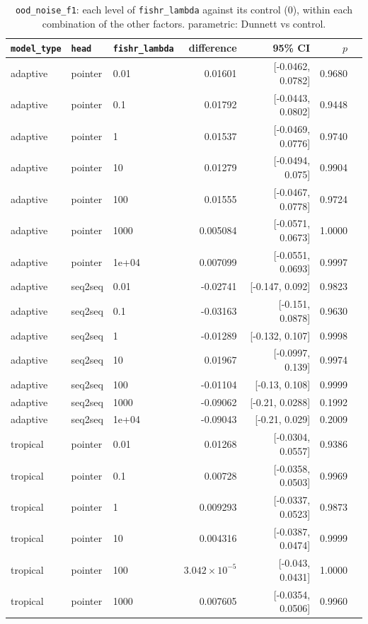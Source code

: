 \documentclass[10pt]{article}
\begin{document}
{\small
\begin{longtable}{lllrrrl}
\caption{\texttt{ood\_noise\_f1}: each level of \texttt{fishr\_lambda} against its control (0), within each combination of the other factors. parametric: Dunnett vs control.}\label{tab:control-ood_noise_f1}\\
\toprule
\texttt{model\_type} & \texttt{head} & \texttt{fishr\_lambda} & difference & 95\% CI & $p$ & \\
\midrule
\endhead
adaptive & pointer & 0.01 & 0.01601 & [-0.0462, 0.0782] & 0.9680 & \\
adaptive & pointer & 0.1 & 0.01792 & [-0.0443, 0.0802] & 0.9448 & \\
adaptive & pointer & 1 & 0.01537 & [-0.0469, 0.0776] & 0.9740 & \\
adaptive & pointer & 10 & 0.01279 & [-0.0494, 0.075] & 0.9904 & \\
adaptive & pointer & 100 & 0.01555 & [-0.0467, 0.0778] & 0.9724 & \\
adaptive & pointer & 1000 & 0.005084 & [-0.0571, 0.0673] & 1.0000 & \\
adaptive & pointer & 1e+04 & 0.007099 & [-0.0551, 0.0693] & 0.9997 & \\
adaptive & seq2seq & 0.01 & -0.02741 & [-0.147, 0.092] & 0.9823 & \\
adaptive & seq2seq & 0.1 & -0.03163 & [-0.151, 0.0878] & 0.9630 & \\
adaptive & seq2seq & 1 & -0.01289 & [-0.132, 0.107] & 0.9998 & \\
adaptive & seq2seq & 10 & 0.01967 & [-0.0997, 0.139] & 0.9974 & \\
adaptive & seq2seq & 100 & -0.01104 & [-0.13, 0.108] & 0.9999 & \\
adaptive & seq2seq & 1000 & -0.09062 & [-0.21, 0.0288] & 0.1992 & \\
adaptive & seq2seq & 1e+04 & -0.09043 & [-0.21, 0.029] & 0.2009 & \\
tropical & pointer & 0.01 & 0.01268 & [-0.0304, 0.0557] & 0.9386 & \\
tropical & pointer & 0.1 & 0.00728 & [-0.0358, 0.0503] & 0.9969 & \\
tropical & pointer & 1 & 0.009293 & [-0.0337, 0.0523] & 0.9873 & \\
tropical & pointer & 10 & 0.004316 & [-0.0387, 0.0474] & 0.9999 & \\
tropical & pointer & 100 & $3.042\times10^{-5}$ & [-0.043, 0.0431] & 1.0000 & \\
tropical & pointer & 1000 & 0.007605 & [-0.0354, 0.0506] & 0.9960 & \\

\end{longtable}}
\end{document}
